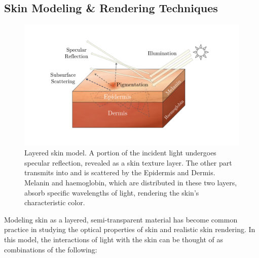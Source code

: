 \begin{spacing}{1.5}
\section{Skin Modeling \& Rendering Techniques}

\begin{figure}[t]
    \centering
    \includegraphics[width=0.9\columnwidth]{Chapter2/skin_model2.pdf}
    \caption{Layered skin model. A portion of the incident light undergoes specular reflection, revealed as a skin texture layer. The other part transmits into and is scattered by the Epidermis and Dermis. Melanin and haemoglobin, which are distributed in these two layers, absorb specific wavelengths of light, rendering the skin's characteristic color.}
    \label{fig:skin_model}
\end{figure}

Modeling skin as a layered, semi-transparent material has become common practice in studying the optical properties of skin and realistic skin rendering\cite{10.5555/2383894.2383946}. In this model, the interactions of light with the skin can be thought of as combinations of the following:


\end{spacing}
